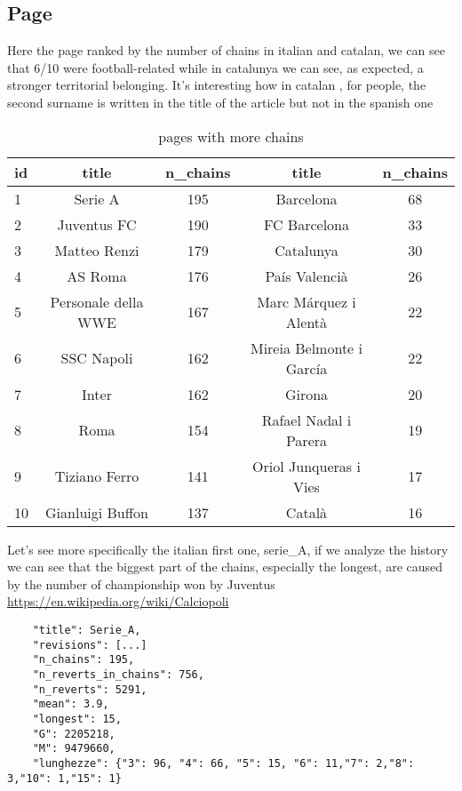 \subsection{Page}
Here the page ranked by the number of chains in italian and catalan, we can see that 6/10 were
football-related while in catalunya we can see, as expected, a stronger territorial belonging. It's
interesting how in catalan , for people, the second surname is written in the title of the article
but not in the spanish one
\begin{table}[H]
    \centering
    \begin{tabularx}{\columnwidth}{@{}Xcccc@{}}
        \midrule
        \textbf{id} & \textbf{title} & \textbf{n\_chains}& \textbf{title} & \textbf{n\_chains} \\ \toprule
        1 & Serie A & 195  & Barcelona & 68\\
        2 & Juventus FC & 190  & FC Barcelona & 33\\
        3 & Matteo Renzi & 179  & Catalunya & 30\\
        4 & AS Roma & 176  &País Valencià& 26\\
        5 & Personale della WWE & 167  &Marc Márquez i Alentà & 22\\
        6 & SSC Napoli & 162  & Mireia Belmonte i García& 22\\
        7 & Inter  & 162  &Girona & 20\\
        8 & Roma & 154 & Rafael Nadal i Parera & 19\\
        9 & Tiziano Ferro & 141 & Oriol Junqueras i Vies& 17\\
        10 & Gianluigi Buffon & 137  &Català & 16\\
        
         \bottomrule
    \end{tabularx}
    
    \caption{pages with more chains \label{table:chainspage}}
\end{table}

Let's see more specifically the italian first one, serie\_A, if we analyze the history we can see
that the biggest part of the chains, especially the longest, are caused by the number of championship won by Juventus \url{https://en.wikipedia.org/wiki/Calciopoli} 
\begin{verbatim}
    "title": Serie_A,
    "revisions": [...] 
    "n_chains": 195,
    "n_reverts_in_chains": 756,
    "n_reverts": 5291,
    "mean": 3.9,
    "longest": 15,
    "G": 2205218,
    "M": 9479660,
    "lunghezze": {"3": 96, "4": 66, "5": 15, "6": 11,"7": 2,"8": 3,"10": 1,"15": 1}
\end{verbatim}

